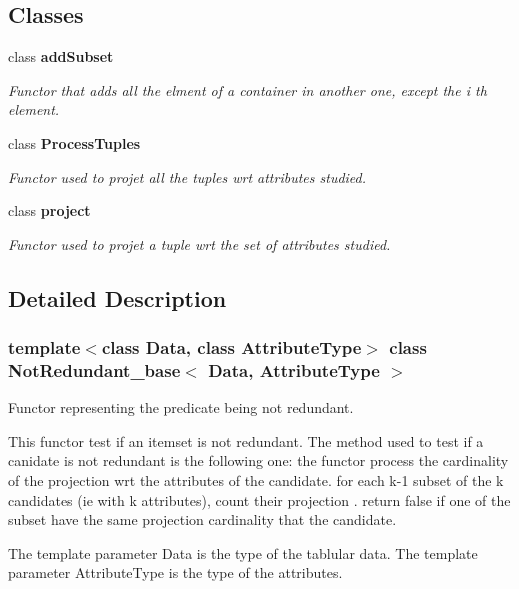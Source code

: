 \subsection*{Classes}
\begin{CompactItemize}
\item 
class {\bf add\-Subset}
\begin{CompactList}\small\item\em Functor that adds all the elment of a container in another one, except the i th element. \item\end{CompactList}\item 
class {\bf Process\-Tuples}
\begin{CompactList}\small\item\em Functor used to projet all the tuples wrt attributes studied. \item\end{CompactList}\item 
class {\bf project}
\begin{CompactList}\small\item\em Functor used to projet a tuple wrt the set of attributes studied. \item\end{CompactList}\end{CompactItemize}


\subsection{Detailed Description}
\subsubsection*{template$<$class Data, class Attribute\-Type$>$ class Not\-Redundant\_\-base$<$ Data, Attribute\-Type $>$}

Functor representing the predicate being not redundant. 

This functor test if an itemset is not redundant. The method used to test if a canidate is not redundant is the following one: the functor process the cardinality of the projection wrt the attributes of the candidate. for each k-1 subset of the k candidates (ie with k attributes), count their projection . return false if one of the subset have the same projection cardinality that the candidate.

The template parameter Data is the type of the tablular data. The template parameter Attribute\-Type is the type of the attributes. 



